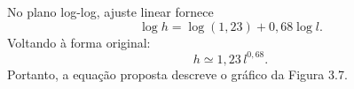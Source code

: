 No plano log-log, ajuste linear fornece
\[
\log h = \log(1{,}23) + 0{,}68\log l.
\]
Voltando à forma original:
\[
h \simeq 1{,}23\,l^{0{,}68}.
\]
Portanto, a equação proposta descreve o gráfico da Figura 3.7.

